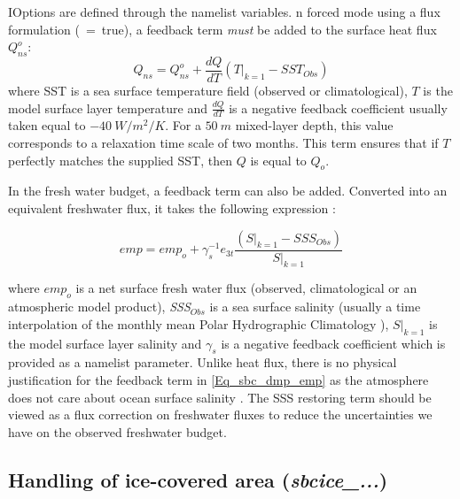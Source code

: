 \documentclass[NEMO_book]{subfiles}
\begin{document}
IOptions are defined through the   namelist variables.
n forced mode using a flux formulation (~=~true), a 
feedback term \emph{must} be added to the surface heat flux $Q_{ns}^o$:
\begin{equation} \label{Eq_sbc_dmp_q}
Q_{ns} = Q_{ns}^o + \frac{dQ}{dT} \left( \left. T \right|_{k=1} - SST_{Obs} \right)
\end{equation}
where SST is a sea surface temperature field (observed or climatological), $T$ is 
the model surface layer temperature and $\frac{dQ}{dT}$ is a negative feedback 
coefficient usually taken equal to $-40~W/m^2/K$. For a $50~m$ 
mixed-layer depth, this value corresponds to a relaxation time scale of two months. 
This term ensures that if $T$ perfectly matches the supplied SST, then $Q$ is 
equal to $Q_o$. 

In the fresh water budget, a feedback term can also be added. Converted into an 
equivalent freshwater flux, it takes the following expression :

\begin{equation} \label{Eq_sbc_dmp_emp}
\textit{emp} = \textit{emp}_o + \gamma_s^{-1} e_{3t}  \frac{  \left(\left.S\right|_{k=1}-SSS_{Obs}\right)}
												         {\left.S\right|_{k=1}}
\end{equation}

where $\textit{emp}_{o }$ is a net surface fresh water flux (observed, climatological or an
atmospheric model product), \textit{SSS}$_{Obs}$ is a sea surface salinity (usually a time 
interpolation of the monthly mean Polar Hydrographic Climatology \citep{Steele2001}), 
$\left.S\right|_{k=1}$ is the model surface layer salinity and $\gamma_s$ is a negative 
feedback coefficient which is provided as a namelist parameter. Unlike heat flux, there is no 
physical justification for the feedback term in \ref{Eq_sbc_dmp_emp} as the atmosphere 
does not care about ocean surface salinity \citep{Madec1997}. The SSS restoring 
term should be viewed as a flux correction on freshwater fluxes to reduce the 
uncertainties we have on the observed freshwater budget.

\subsection{Handling of ice-covered area  (\textit{sbcice\_...})}
\label{SBC_ice-cover}
\end{document}

